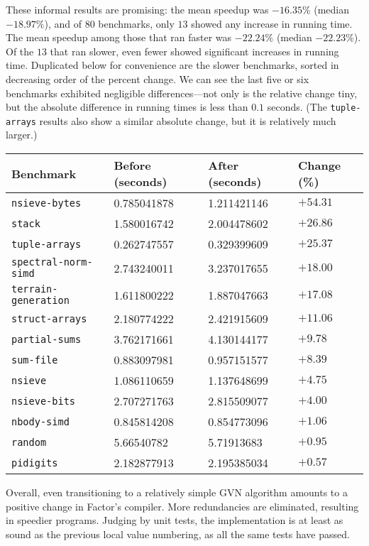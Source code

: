 \begin{sloppypar}
These informal results are promising: the mean speedup was $-16.35\%$ (median
$-18.97\%$), and of $80$ benchmarks, only $13$ showed any increase in running
time.  The mean speedup among those that ran faster was $-22.24\%$ (median
$-22.23\%$).  Of the $13$ that ran slower, even fewer showed significant
increases in running time.  Duplicated below for convenience are the slower
benchmarks, sorted in decreasing order of the percent change.  We can see the
last five or six benchmarks exhibited negligible differences---not only is the
relative change tiny, but the absolute difference in running times is less than
$0.1$ seconds.  (The \Verb|tuple-arrays| results also show a similar absolute
change, but it is relatively much larger.)
\end{sloppypar}

\begin{longtable}{llll}
\toprule
Benchmark & Before (seconds) & After (seconds) & Change (\%) \\
\midrule
\endhead
\texttt{nsieve-bytes}             & 0.785041878       & 1.211421146         & $+54.31$    \\
\texttt{stack}                    & 1.580016742       & 2.004478602         & $+26.86$    \\
\texttt{tuple-arrays}             & 0.262747557       & 0.329399609         & $+25.37$    \\
\texttt{spectral-norm-simd}       & 2.743240011       & 3.237017655         & $+18.00$    \\
\texttt{terrain-generation}       & 1.611800222       & 1.887047663         & $+17.08$    \\
\texttt{struct-arrays}            & 2.180774222       & 2.421915609         & $+11.06$    \\
\texttt{partial-sums}             & 3.762171661       & 4.130144177         & $+9.78$     \\
\texttt{sum-file}                 & 0.883097981       & 0.957151577         & $+8.39$     \\
\texttt{nsieve}                   & 1.086110659       & 1.137648699         & $+4.75$     \\
\texttt{nsieve-bits}              & 2.707271763       & 2.815509077         & $+4.00$     \\
\texttt{nbody-simd}               & 0.845814208       & 0.854773096         & $+1.06$     \\
\texttt{random}                   & 5.66540782        & 5.71913683          & $+0.95$     \\
\texttt{pidigits}                 & 2.182877913       & 2.195385034         & $+0.57$     \\
\end{longtable}

Overall, even transitioning to a relatively simple \gls{GVN} algorithm amounts
to a positive change in Factor's compiler.  More redundancies are eliminated,
resulting in speedier programs.  Judging by unit tests, the implementation is
at least as sound as the previous local value numbering,  as all the same tests
have passed.
